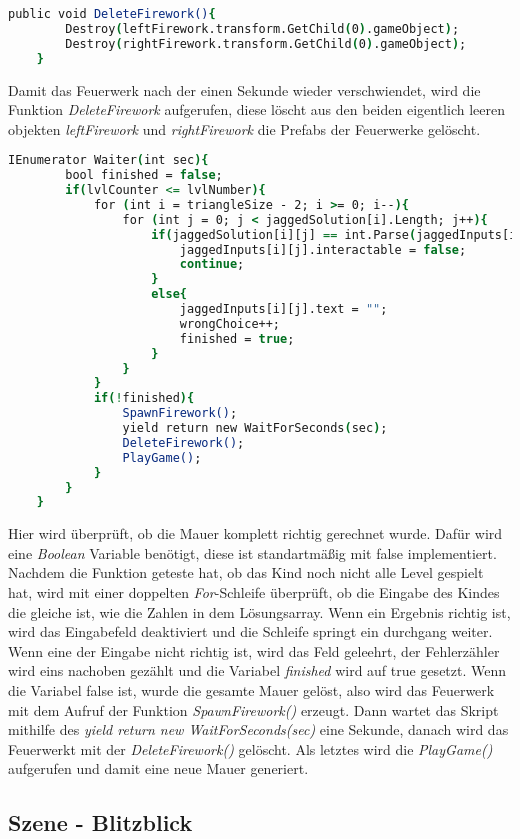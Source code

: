 \begin{lstlisting}[language=csh, caption={Triangle.cs DeleteFirework-Funktion}]
	public void DeleteFirework(){
		Destroy(leftFirework.transform.GetChild(0).gameObject);
		Destroy(rightFirework.transform.GetChild(0).gameObject);
	}
\end{lstlisting}
Damit das Feuerwerk nach der einen Sekunde wieder verschwiendet, wird die Funktion \textit{DeleteFirework} aufgerufen, diese löscht aus den beiden eigentlich leeren objekten \textit{leftFirework} und \textit{rightFirework} die Prefabs der Feuerwerke gelöscht.\\
\begin{lstlisting}[language=csh, caption={Triangle.cs Waiter-Funktion}]
	IEnumerator Waiter(int sec){
		bool finished = false;
		if(lvlCounter <= lvlNumber){
			for (int i = triangleSize - 2; i >= 0; i--){
				for (int j = 0; j < jaggedSolution[i].Length; j++){
					if(jaggedSolution[i][j] == int.Parse(jaggedInputs[i][j].text)){
						jaggedInputs[i][j].interactable = false;
						continue;
					}
					else{
						jaggedInputs[i][j].text = "";
						wrongChoice++;
						finished = true;
					}
				}
			}
			if(!finished){
				SpawnFirework();
				yield return new WaitForSeconds(sec);
				DeleteFirework();
				PlayGame();
			}
		}
	}
\end{lstlisting}
Hier wird überprüft, ob die Mauer komplett richtig gerechnet wurde. Dafür wird eine \textit{Boolean} Variable benötigt, diese ist standartmäßig mit false implementiert. Nachdem die Funktion geteste hat, ob das Kind noch nicht alle Level gespielt hat, wird mit einer doppelten \textit{For}-Schleife überprüft, ob die Eingabe des Kindes die gleiche ist, wie die Zahlen in dem Lösungsarray. Wenn ein Ergebnis richtig ist, wird das Eingabefeld deaktiviert und die Schleife springt ein durchgang weiter. Wenn eine der Eingabe nicht richtig ist, wird das Feld geleehrt, der Fehlerzähler wird eins nachoben gezählt und die Variabel \textit{finished} wird auf true gesetzt. Wenn die Variabel false ist, wurde die gesamte Mauer gelöst, also wird das Feuerwerk mit dem Aufruf der Funktion \textit{SpawnFirework()} erzeugt. Dann wartet das Skript mithilfe des \textit{yield return new WaitForSeconds(sec)} eine Sekunde, danach wird das Feuerwerkt mit der \textit{DeleteFirework()} gelöscht. Als letztes wird die \textit{PlayGame()} aufgerufen und damit eine neue Mauer generiert.\\
\subsection{Szene - Blitzblick}
